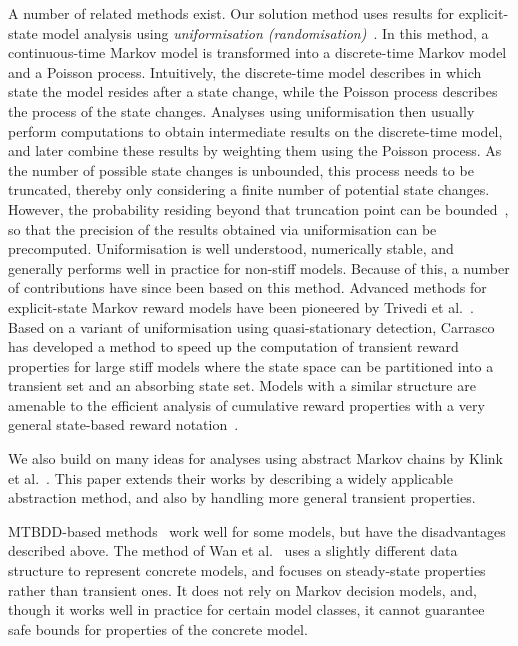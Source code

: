 \documentclass[10pt,twocolumn]{article}
\begin{document}
A number of related methods exist.
Our solution method uses results for explicit-state model analysis using \emph{uniformisation (randomisation)}~\cite{Jensen53,GrossM84}.
In this method, a continuous-time Markov model is transformed into a discrete-time Markov model and a Poisson process.
Intuitively, the discrete-time model describes in which state the model resides after a state change, while the Poisson process describes the process of the state changes.
Analyses using uniformisation then usually perform computations to obtain intermediate results on the discrete-time model, and later combine these results by weighting them using the Poisson process.
As the number of possible state changes is unbounded, this process needs to be truncated, thereby only considering a finite number of potential state changes. However, the probability residing beyond that truncation point can be bounded~\cite{FoxG88}, so that the precision of the results obtained via uniformisation can be precomputed.
Uniformisation is well understood, numerically stable, and generally performs well in practice for non-stiff models.
Because of this, a number of contributions have since been based on this method.
Advanced methods for explicit-state Markov reward models have been pioneered by Trivedi et al.~\cite{TrivediRS87}. Based on a variant of uniformisation using quasi-stationary detection, Carrasco has developed a method \cite{Carrasco04} to speed up the
computation of transient reward properties for large stiff models where the state space can be partitioned into a transient set and an absorbing state set. Models with a similar structure are amenable to the efficient analysis of cumulative reward properties with a very general state-based reward
notation~\cite{CarrascoS11}.

We also build on many ideas for analyses using abstract Markov chains
by Klink et al.~\cite{Klink10,KatoenKLW07}. This paper extends their
works by describing a widely applicable abstraction method, and also
by handling more general transient properties.

MTBDD-based methods~\cite{Parker02,HermannsKNPS03} work well for some
models, but have the disadvantages described above.
The method of Wan et al.~\cite{WanCM11} uses a slightly different data
structure to represent concrete models, and focuses on steady-state
properties rather than transient ones. It does not rely on Markov
decision models, and, though it works well in practice for certain
model classes, it cannot guarantee safe bounds for properties of the
concrete model.
\end{document}
